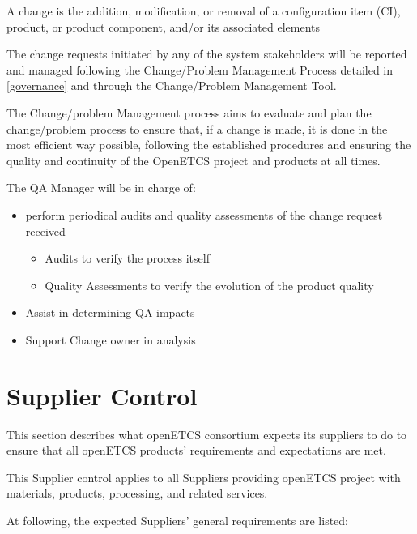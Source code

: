 \documentclass{template/openetcs_article}
\begin{document}
A change is the addition, modification, or removal of a configuration item (CI), product, or product component, and/or its associated elements

The change requests initiated by any of the system stakeholders will be reported and managed following the Change/Problem Management Process  \citep{emp} detailed in \href{https://github.com/openETCS/governance/tree/master/Change-Problem%20Process}{[governance]} and through the Change/Problem Management Tool.

The Change/problem Management process aims to evaluate and plan the change/problem process to ensure that, if a change is made, it is done in the most efficient way possible, following the established procedures and ensuring the quality and continuity of the OpenETCS project and products at all times.

The QA Manager will be in charge of:
\begin{itemize}
\item perform periodical audits and quality assessments of the change request received
\begin{itemize}
\item Audits to verify the process itself
\item Quality Assessments to verify the evolution of the product quality
\end{itemize}
\item Assist in determining QA impacts
\item Support Change owner in analysis
\end{itemize}


\section{Supplier Control}


This section describes what openETCS consortium expects its suppliers to do to
ensure that all openETCS products' requirements and expectations are met.

This Supplier control applies to all Suppliers providing openETCS project with materials, products, processing, and related services.

At following, the expected Suppliers' general requirements are listed:
\end{document}
